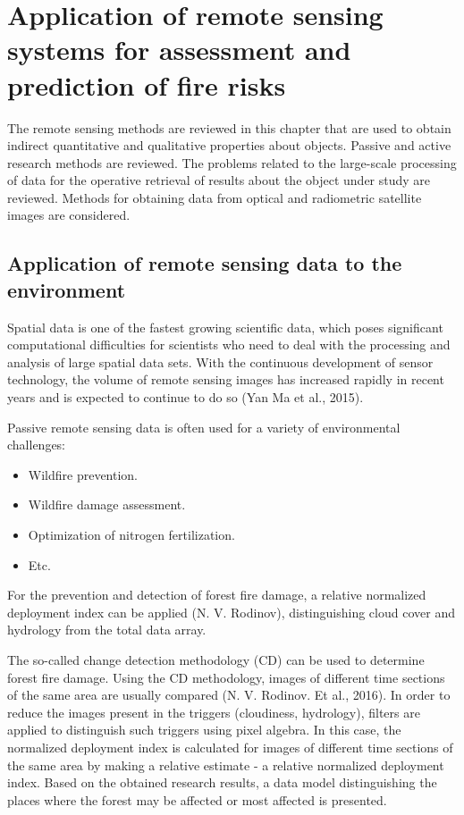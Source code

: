 \chapter{Application of remote sensing systems for assessment and prediction of fire risks}
	\label{cha:literature}

	The remote sensing methods are reviewed in this chapter that are used to obtain indirect quantitative and qualitative properties about objects. Passive and active research methods are reviewed. The problems related to the large-scale processing of data for the operative retrieval of results about the object under study are reviewed. Methods for obtaining data from optical and radiometric satellite images are considered.

\section{Application of remote sensing data to the environment}
	Spatial data is one of the fastest growing scientific data, which poses significant computational difficulties for scientists who need to deal with the processing and analysis of large spatial data sets. With the continuous development of sensor technology, the volume of remote sensing images has increased rapidly in recent years and is expected to continue to do so (Yan Ma et al., 2015).
	
	Passive remote sensing data is often used for a variety of environmental challenges:
\begin{itemize}
	\item Wildfire prevention.
	\item Wildfire damage assessment.
	\item Optimization of nitrogen fertilization.
	\item Etc.
\end{itemize}

	For the prevention and detection of forest fire damage, a relative normalized deployment index can be applied (N. V. Rodinov), distinguishing cloud cover and hydrology from the total data array.

	The so-called change detection methodology (CD) can be used to determine forest fire damage. Using the CD methodology, images of different time sections of the same area are usually compared (N. V. Rodinov. Et al., 2016). In order to reduce the images present in the triggers (cloudiness, hydrology), filters are applied to distinguish such triggers using pixel algebra. In this case, the normalized deployment index is calculated for images of different time sections of the same area by making a relative estimate - a relative normalized deployment index. Based on the obtained research results, a data model distinguishing the places where the forest may be affected or most affected is presented.
	
